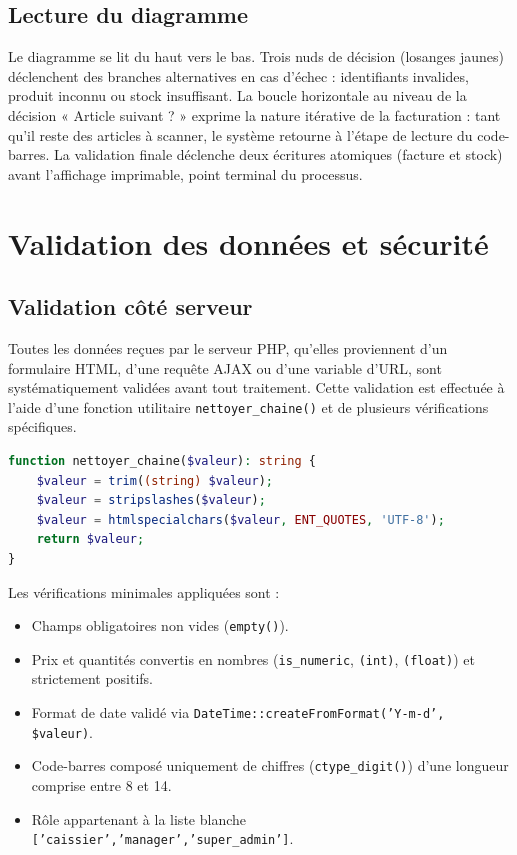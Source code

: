 \documentclass[12pt,a4paper]{article}
\begin{document}
\subsection{Lecture du diagramme}

Le diagramme se lit du haut vers le bas. Trois nuds de décision (losanges jaunes) déclenchent des branches alternatives en cas d'échec : identifiants invalides, produit inconnu ou stock insuffisant. La boucle horizontale au niveau de la décision « Article suivant ? » exprime la nature itérative de la facturation : tant qu'il reste des articles à scanner, le système retourne à l'étape de lecture du code-barres. La validation finale déclenche deux écritures atomiques (facture et stock) avant l'affichage imprimable, point terminal du processus.

\section{Validation des données et sécurité}
\label{sec:validation}

\subsection{Validation côté serveur}

Toutes les données reçues par le serveur PHP, qu'elles proviennent d'un formulaire HTML, d'une requête AJAX ou d'une variable d'URL, sont systématiquement validées avant tout traitement. Cette validation est effectuée à l'aide d'une fonction utilitaire \texttt{nettoyer\_chaine()} et de plusieurs vérifications spécifiques.

\begin{lstlisting}[language=PHP, caption={Assainissement des chaînes de caractères}]
function nettoyer_chaine($valeur): string {
    $valeur = trim((string) $valeur);
    $valeur = stripslashes($valeur);
    $valeur = htmlspecialchars($valeur, ENT_QUOTES, 'UTF-8');
    return $valeur;
}
\end{lstlisting}

Les vérifications minimales appliquées sont :

\begin{itemize}[leftmargin=1.5em]
    \item Champs obligatoires non vides (\texttt{empty()}).
    \item Prix et quantités convertis en nombres (\texttt{is\_numeric}, \texttt{(int)}, \texttt{(float)}) et strictement positifs.
    \item Format de date validé via \texttt{DateTime::createFromFormat('Y-m-d', \$valeur)}.
    \item Code-barres composé uniquement de chiffres (\texttt{ctype\_digit()}) d'une longueur comprise entre 8 et 14.
    \item Rôle appartenant à la liste blanche \texttt{['caissier','manager','super\_admin']}.
\end{itemize}
\end{document}
